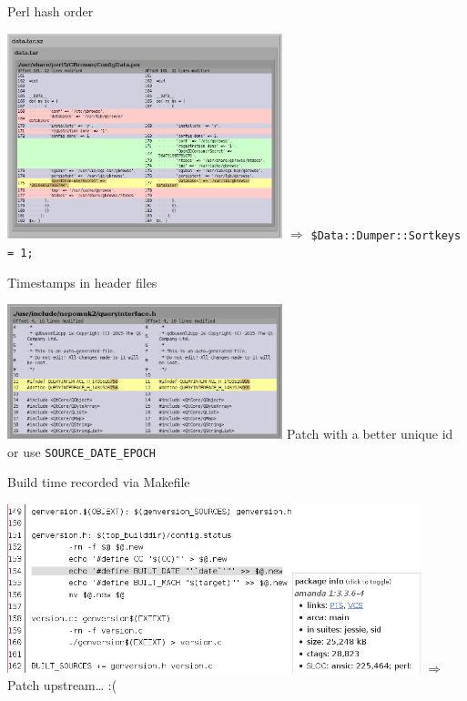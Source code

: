 \documentclass[14pt,aspectratio=169]{beamer}
\begin{document}

\begin{frame}{Perl hash order}
 \begin{center}
  \includegraphics[width=0.6\textwidth]{images/examples/random_perl_hash_order.png}
  \vfill
  $\Longrightarrow$ \texttt{\$Data::Dumper::Sortkeys = 1;}
 \end{center}
\end{frame}

\begin{frame}{Timestamps in header files}
 \begin{center}
  \includegraphics[width=0.6\textwidth]{images/examples/timestamps_in_header_files.png}
  \vfill
  Patch with a better unique id or use \texttt{SOURCE\_DATE\_EPOCH}
 \end{center}
\end{frame}

\begin{frame}{Build time recorded via Makefile}
 \begin{center}
  \includegraphics[width=0.9\textwidth]{images/examples/build_date_in_makefile.png}
  \vfill
  $\Longrightarrow$ Patch upstream\ldots{} :(
 \end{center}
\end{frame}
\end{document}
